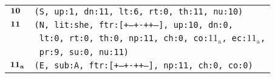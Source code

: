 \documentclass{article}
\begin{document}
\begin{minipage}{\textwidth}
{\begin{tabular}{|r|l|}
    ${\textbf{\textrm{10}}_{\phantom{z}}}$ & \texttt{\texttt{(S,~up:1,~dn:11,~lt:6,~rt:0,~th:11,~nu:10)}} \\
    ${\textbf{\textrm{11}}_{\phantom{z}}}$ & \texttt{\texttt{(N,~lit:she,~ftr:[+--+-++--],~up:10,~dn:0,}} \\
    & \texttt{\texttt{~lt:0,~rt:0,~th:0,~np:11,~ch:0,~co:${\textrm{11}_{\textrm{a}}}$,~ec:${\textrm{11}_{\textrm{a}}}$,}} \\
    & \texttt{\texttt{~pr:9,~su:0,~nu:11)}} \\
    ${\textbf{\textrm{11}}_{\textbf{\textrm{a}}}}$ & \texttt{\texttt{(E,~sub:A,~ftr:[+--+-++--],~np:11,~ch:0,~co:0)}} \\
    \hline
  \end{tabular}
  }
\end{minipage}
\bigbreak
\end{document}
